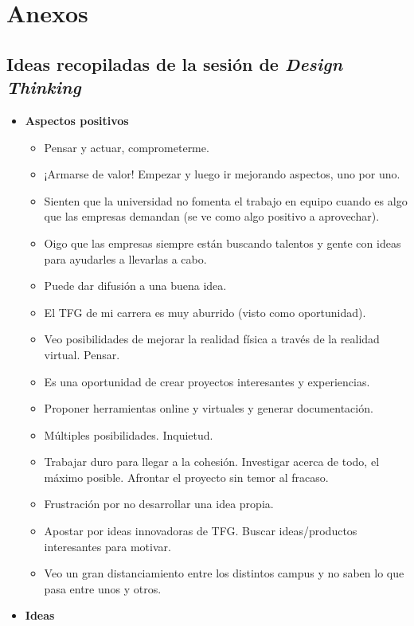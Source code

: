 \chapter{Anexos}
\label{ch:anexos}

\section{Ideas recopiladas de la sesión de \textit{Design Thinking}}
\label{sec:designthinking}
\begin{itemize}
    \item \textbf{Aspectos positivos}
    \begin{itemize}
        \item Pensar y actuar, comprometerme.
        \item ¡Armarse de valor! Empezar y luego ir mejorando aspectos, uno por uno.
        \item Sienten que la universidad no fomenta el trabajo en equipo cuando es algo que las empresas demandan (se ve como algo positivo a aprovechar).
        \item Oigo que las empresas siempre están buscando talentos y gente con ideas para ayudarles a llevarlas a cabo.
        \item Puede dar difusión a una buena idea.
        \item El TFG de mi carrera es muy aburrido (visto como oportunidad).
        \item Veo posibilidades de mejorar la realidad física a través de la realidad virtual. Pensar.
        \item Es una oportunidad de crear proyectos interesantes y experiencias.
        \item Proponer herramientas online y virtuales y generar documentación.
        \item Múltiples posibilidades. Inquietud.
        \item Trabajar duro para llegar a la cohesión. Investigar acerca de todo, el máximo posible. Afrontar el proyecto sin temor al fracaso.
        \item Frustración por no desarrollar una idea propia.
        \item Apostar por ideas innovadoras de TFG. Buscar ideas/productos interesantes para motivar.
        \item Veo un gran distanciamiento entre los distintos campus y no saben lo que pasa entre unos y otros.
    \end{itemize}
    \item \textbf{Ideas}

\end{itemize}
